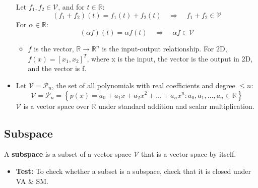 \begin{example}
\begin{itemize}
            Let \( f_1, f_2 \in \mathcal{V} \), and for \( t \in \mathbb{R} \):
            \[
            (f_1 + f_2)(t) = f_1(t) + f_2(t) \quad \Rightarrow \quad f_1 + f_2 \in \mathcal{V}
            \]
            For \( \alpha \in \mathbb{R} \):
            \[
            (\alpha f)(t) = \alpha f(t) \quad \Rightarrow \quad \alpha f \in \mathcal{V}
            \]
            \begin{itemize}
                \item $f$ is the vector, $\mathbb{R} \rightarrow \mathbb{R}^n$ is the input-output relationship. For 2D, $f(x) = [x_1,x_2]^T$, where x is the input, the vector is the output in 2D, and the vector is f.
            \end{itemize}
        
            \item Let \( \mathcal{V} = \mathcal{P}_n \), the set of all polynomials with real coefficients and degree \( \leq n \):
            \[
            \mathcal{V} = \mathcal{P}_n = \left\{ p(x) = a_0 + a_1 x + a_2 x^2 + \ldots + a_n x^n : a_0, a_1, \ldots, a_n \in \mathbb{R} \right\}
            \]
            \( \mathcal{V} \) is a vector space over \( \mathbb{R} \) under standard addition and scalar multiplication.
        \end{itemize}    
    \end{example}

\subsection{Subspace}

\begin{definition}
    A \textbf{subspace} is a subset of a vector space $\mathcal{V}$ that is a vector space by itself.
    \begin{itemize}
        \item \textbf{Test:} To check whether a subset is a subspace, check that it is closed under VA \& SM.
    \end{itemize}
\end{definition}

